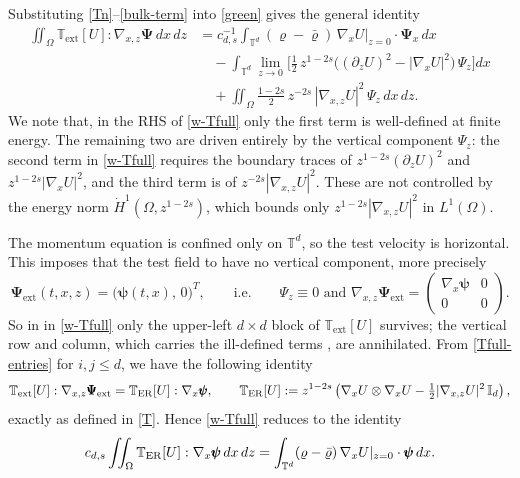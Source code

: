 \documentclass[12pt,a4paper,twoside]{article}
\newcommand{\vr}{\varrho}
\newcommand{\Grad}{\nabla}
\numberwithin{equation}{section}%
\newcommand{\tcbb}{\textcolor{black!30!blue}}
\begin{document}
\medskip
\noindent Substituting \eqref{Tn}--\eqref{bulk-term} into \eqref{green} gives the general identity
\begin{equation}\label{w-Tfull}
	\begin{aligned}
		\iint_{\Omega} \mathbb{T}_{\mathrm{ext}}[U] : \Grad_{x,z}\pmb{\Psi}\,dx\,dz
		&= c_{d,s}^{-1}\int_{\mathbb{T}^d} (\vr-\bar\vr)\,\Grad_x U|_{z=0}\cdot\pmb{\Psi}_x\,dx \\
		&\quad - \int_{\mathbb{T}^d} \lim_{z\to0}\Big[ \tfrac12\, z^{1-2s} \big((\partial_z U)^2 - |\Grad_x U|^2\big)\, \Psi_z \Big]dx \\
		&\quad + \iint_{\Omega} \tfrac{1-2s}{2}\, z^{-2s}\,|\Grad_{x,z}U|^2\, \Psi_z \,dx\,dz .
	\end{aligned}
\end{equation}
We note that, in the RHS of \eqref{w-Tfull} only the first term is well-defined at finite energy. The remaining two are driven entirely by the vertical component $\Psi_z$: the second term in \eqref{w-Tfull} requires the boundary traces of $z^{1-2s}(\partial_z U)^2$ and $z^{1-2s}|\Grad_x U|^2$, and the third term is of $z^{-2s}|\Grad_{x,z}U|^2$. These are not controlled by the energy norm $\dot H^1(\Omega, z^{1-2s})$, which bounds only $z^{1-2s}|\Grad_{x,z}U|^2$ in $L^1(\Omega)$.\par %
The momentum equation is confined only on $\mathbb{T}^d$, so the test velocity is horizontal. This imposes that the test field to have no vertical component, more precisely
\begin{equation*}
	\pmb{\Psi}_{\mathrm{ext}}(t,x,z) = \big(\pmb{\psi}(t,x),\, 0\big)^T,
	\qquad\text{i.e.}\qquad \Psi_z \equiv 0 \text{ and } \Grad_{x,z}\pmb{\Psi}_{\mathrm{ext}}
	= \begin{pmatrix} \Grad_x \pmb{\psi} & 0 \\ 0 & 0 \end{pmatrix}.
\end{equation*}
So in in \eqref{w-Tfull} only the upper-left $d\times d$ block of $\mathbb{T}_{\mathrm{ext}}[U]$ survives; the vertical row and column, which carries the ill-defined terms , are annihilated. From \eqref{Tfull-entries} for $i,j \le d$, we have the following identity
\begin{equation*}
	\mathbb{T}_{\mathrm{ext}}[U] : \Grad_{x,z}\pmb{\Psi}_{\mathrm{ext}} = \mathbb{T}_{\rm ER}[U] : \Grad_x \pmb{\psi},
	\qquad
	\mathbb{T}_{\rm ER}[U] := z^{1-2s}\left( \Grad_x U \otimes \Grad_x U - \tfrac12 |\Grad_{x,z}U|^2\, \mathbb{I}_d \right),
\end{equation*}
exactly as defined in \eqref{T}. Hence \eqref{w-Tfull} reduces to the identity
\begin{equation}\label{w-T}
	c_{d,s}\iint_{\Omega} \mathbb{T}_{\rm ER}[U] : \Grad_x\pmb{\psi}\,dx\,dz
	= \int_{\mathbb{T}^d} (\vr-\bar\vr)\,\Grad_x U|_{z=0}\cdot\pmb{\psi}\,dx .
\end{equation}
\end{document}
